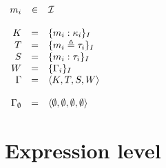 \documentclass{article}[11pt]
\begin{document}
    \begin{math}
        \begin{array}{rclp{5cm}}
            m_i              & \in & {\cal I}                                                   \\
            \\
            K       & =   & \{ m_i : \kappa_i \}_I            \\
            T       & =   & \{ m_i \triangleq \tau_i \}_I     \\
            S       & =   & \{ m_i : \tau_i \}_I              \\
            W       & =   & \{ \Gamma_i \}_I                  \\
            \Gamma  & =   & \langle K, T, S, W \rangle        \\
            \\
            \Gamma_\emptyset & =& \langle \emptyset, \emptyset, \emptyset, \emptyset \rangle
        \end{array}
    \end{math}


    \section{Expression level}\label{sec:expression-level}
\end{document}
